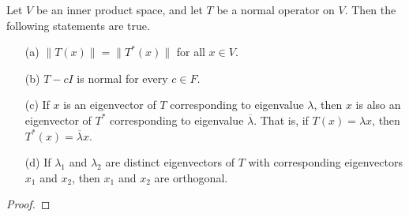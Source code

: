 \begin{theorem}
   Let \( V  \) be an inner product space, and let \( T  \) be a normal operator on \( V  \). Then the following statements are true. 
   \begin{enumerate}
       \item[(a)] \( \|T(x)\| = \|T^{*}(x)\|  \) for all \( x \in V  \).
        \item[(b)] \( T - cI  \) is normal for every \( c \in F  \).
        \item[(c)] If \( x  \) is an eigenvector of \( T  \) corresponding to eigenvalue \( \lambda  \), then \( x  \) is also an eigenvector of \( T^{*} \) corresponding to eigenvalue \( \overline{\lambda} \). That is, if \( T(x) = \lambda x  \), then \( T^{*}(x) = \overline{\lambda } x  \).
        \item[(d)] If \( {\lambda}_{1} \) and \( {\lambda}_{2} \) are distinct eigenvectors of \( T  \) with corresponding eigenvectors \( {x}_{1} \) and \( {x}_{2} \), then \( {x}_{1} \) and \( {x}_{2} \) are orthogonal.
   \end{enumerate}
\end{theorem}

\begin{proof}

\end{proof}
